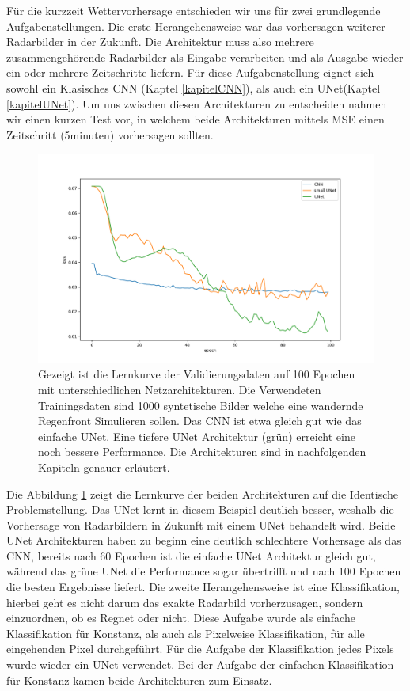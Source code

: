 Für die kurzzeit Wettervorhersage entschieden wir uns für zwei grundlegende Aufgabenstellungen. Die erste Herangehensweise war das vorhersagen weiterer Radarbilder in der Zukunft. Die Architektur muss also mehrere zusammengehörende Radarbilder als Eingabe verarbeiten und als Ausgabe wieder ein oder mehrere Zeitschritte liefern. Für diese Aufgabenstellung eignet sich sowohl ein Klasisches CNN (Kaptel \ref{kapitelCNN}), als auch ein UNet(Kaptel \ref{kapitelUNet}). Um uns zwischen diesen Architekturen zu entscheiden nahmen wir einen kurzen Test vor, in welchem beide Architekturen mittels MSE einen Zeitschritt (5minuten) vorhersagen sollten.
\begin{figure}[h]
	\centering
	\includegraphics[width=\linewidth]{pics/Syntetische_Daten_CNN_UNet.png}
	\caption[Lernkurven verschiedener Architekturen auf Syntetische Daten]{Gezeigt ist die Lernkurve der Validierungsdaten auf 100 Epochen mit unterschiedlichen Netzarchitekturen. Die Verwendeten Trainingsdaten sind 1000 syntetische Bilder welche eine wandernde Regenfront Simulieren sollen. Das CNN ist etwa gleich gut wie das einfache UNet. Eine tiefere UNet Architektur (grün) erreicht eine noch bessere Performance. Die Architekturen sind in nachfolgenden Kapiteln genauer erläutert. }
	\label{imgCNNUNet}
\end{figure}

Die Abbildung \ref{imgCNNUNet} zeigt die Lernkurve der beiden Architekturen auf die Identische Problemstellung. Das UNet lernt in diesem Beispiel deutlich besser, weshalb die Vorhersage von Radarbildern in Zukunft mit einem UNet behandelt wird. Beide UNet Architekturen haben zu beginn eine deutlich schlechtere Vorhersage als das CNN, bereits nach 60 Epochen ist die einfache UNet Architektur gleich gut, während das grüne UNet die Performance sogar übertrifft und nach 100 Epochen die besten Ergebnisse liefert.
\newline
Die zweite Herangehensweise ist eine Klassifikation, hierbei geht es nicht darum das exakte Radarbild vorherzusagen, sondern einzuordnen, ob es Regnet oder nicht. Diese Aufgabe wurde als einfache Klassifikation für Konstanz, als auch als Pixelweise Klassifikation, für alle eingehenden Pixel durchgeführt. Für die Aufgabe der Klassifikation jedes Pixels wurde wieder ein UNet verwendet. Bei der Aufgabe der einfachen Klassifikation für Konstanz kamen beide Architekturen zum Einsatz.

